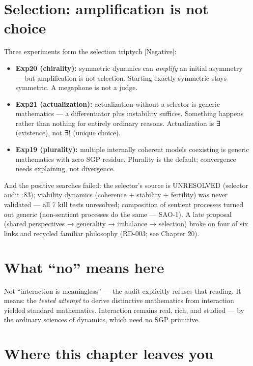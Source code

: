\documentclass[
  11pt,
]{book}
\providecommand{\tightlist}{%
  \setlength{\itemsep}{0pt}\setlength{\parskip}{0pt}}
\begin{document}
\section{Selection: amplification is not
choice}\label{selection-amplification-is-not-choice}

Three experiments form the selection triptych {[}Negative{]}:

\begin{itemize}
\tightlist
\item
  \textbf{Exp20 (chirality):} symmetric dynamics can \emph{amplify} an
  initial asymmetry --- but amplification is not selection. Starting
  exactly symmetric stays symmetric. A megaphone is not a judge.
\item
  \textbf{Exp21 (actualization):} actualization without a selector is
  generic mathematics --- a differentiator plus instability suffices.
  Something happens rather than nothing for entirely ordinary reasons.
  Actualization is ∃ (existence), not ∃! (unique choice).
\item
  \textbf{Exp19 (plurality):} multiple internally coherent models
  coexisting is generic mathematics with zero SGP residue. Plurality is
  the default; convergence needs explaining, not divergence.
\end{itemize}

And the positive searches failed: the selector's source is UNRESOLVED
(selector audit :83); viability dynamics (coherence + stability +
fertility) was never validated --- all 7 kill tests unresolved;
composition of sentient processes turned out generic (non-sentient
processes do the same --- SAO-1). A late proposal (shared perspectives →
generality → imbalance → selection) broke on four of six links and
recycled familiar philosophy (RD-003; see Chapter 20).

\section{What ``no'' means here}\label{what-no-means-here}

Not ``interaction is meaningless'' --- the audit explicitly refuses that
reading. It means: the \emph{tested attempt} to derive distinctive
mathematics from interaction yielded standard mathematics. Interaction
remains real, rich, and studied --- by the ordinary sciences of
dynamics, which need no SGP primitive.

\section{Where this chapter leaves
you}\label{where-this-chapter-leaves-you-10}
\end{document}
